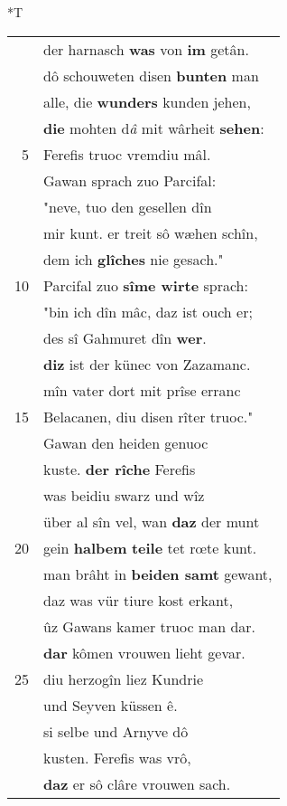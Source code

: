 \documentclass[8pt,a4paper,notitlepage]{article}
\begin{document}
\begin{table}[ht]
\begin{minipage}[t]{0.5\linewidth}
\small
\begin{center}*T
\end{center}
\begin{tabular}{rl}
 & der harnasch \textbf{was} von \textbf{im} getân.\\ 
 & dô schouweten disen \textbf{bunten} man\\ 
 & alle, die \textbf{wunders} kunden jehen,\\ 
 & \textbf{die} mohten d\textit{â} mit wârheit \textbf{sehen}:\\ 
5 & Ferefis truoc vremdiu mâl.\\ 
 & Gawan sprach zuo Parcifal:\\ 
 & "neve, tuo den gesellen dîn\\ 
 & mir kunt. er treit sô wæhen schîn,\\ 
 & dem ich \textbf{glîches} nie gesach."\\ 
10 & Parcifal zuo \textbf{sîme wirte} sprach:\\ 
 & "bin ich dîn mâc, daz ist ouch er;\\ 
 & des sî Gahmuret dîn \textbf{wer}.\\ 
 & \textbf{diz} ist der künec von Zazamanc.\\ 
 & mîn vater dort mit prîse erranc\\ 
15 & Belacanen, diu disen rîter truoc."\\ 
 & Gawan den heiden genuoc\\ 
 & kuste. \textbf{der rîche} Ferefis\\ 
 & was beidiu swarz und wîz\\ 
 & über al sîn vel, wan \textbf{daz} der munt\\ 
20 & gein \textbf{halbem} \textbf{teile} tet rœte kunt.\\ 
 & man brâht in \textbf{beiden samt} gewant,\\ 
 & daz was vür tiure kost erkant,\\ 
 & ûz Gawans kamer truoc man dar.\\ 
 & \textbf{dar} kômen vrouwen lieht gevar.\\ 
25 & diu herzogîn liez Kundrie\\ 
 & und Seyven küssen ê.\\ 
 & si selbe und Arnyve dô\\ 
 & kusten. Ferefis was vrô,\\ 
 & \textbf{daz} er sô clâre vrouwen sach.\\ 

\end{tabular}
\end{minipage}
\end{table}
\end{document}
